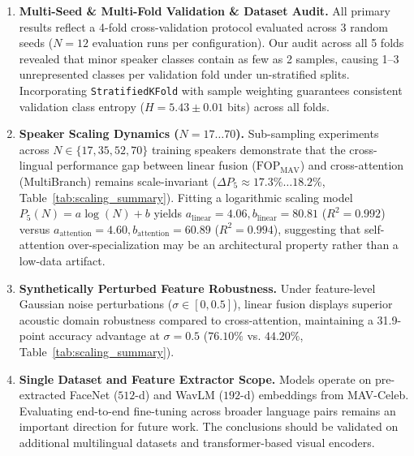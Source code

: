 \documentclass[conference]{IEEEtran}
\begin{document}
\begin{enumerate}
\item \textbf{Multi-Seed & Multi-Fold Validation & Dataset Audit.}
All primary results reflect a 4-fold cross-validation protocol evaluated across 3 random seeds ($N=12$ evaluation runs per configuration). Our audit across all 5 folds revealed that minor speaker classes contain as few as 2 samples, causing 1--3 unrepresented classes per validation fold under un-stratified splits. Incorporating \texttt{StratifiedKFold} with sample weighting guarantees consistent validation class entropy ($H = 5.43 \pm 0.01$ bits) across all folds.

\item \textbf{Speaker Scaling Dynamics ($N=17 \dots 70$).}
Sub-sampling experiments across $N \in \{17, 35, 52, 70\}$ training speakers demonstrate that the cross-lingual performance gap between linear fusion ($\text{FOP}_{\text{MAV}}$) and cross-attention (MultiBranch) remains scale-invariant ($\Delta P_5 \approx 17.3\% \dots 18.2\%$, Table~\ref{tab:scaling_summary}). Fitting a logarithmic scaling model $P_5(N) = a \log(N) + b$ yields $a_{\text{linear}} = 4.06, b_{\text{linear}} = 80.81$ ($R^2 = 0.992$) versus $a_{\text{attention}} = 4.60, b_{\text{attention}} = 60.89$ ($R^2 = 0.994$), suggesting that self-attention over-specialization may be an architectural property rather than a low-data artifact.

\item \textbf{Synthetically Perturbed Feature Robustness.}
Under feature-level Gaussian noise perturbations ($\sigma \in [0, 0.5]$), linear fusion displays superior acoustic domain robustness compared to cross-attention, maintaining a 31.9-point accuracy advantage at $\sigma=0.5$ ($76.10\%$ vs. $44.20\%$, Table~\ref{tab:scaling_summary}).

\item \textbf{Single Dataset and Feature Extractor Scope.}
Models operate on pre-extracted FaceNet ($512$-d) and WavLM ($192$-d) embeddings from MAV-Celeb. Evaluating end-to-end fine-tuning across broader language pairs remains an important direction for future work. The conclusions should be validated on additional multilingual datasets and transformer-based visual encoders.
\end{enumerate}
\end{document}
